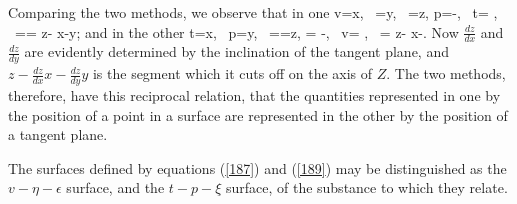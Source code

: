 \documentclass[12pt]{article}
\begin{document}
Comparing the two methods, we observe that in one
\eqs v=x, \ \eta=y, \ \epsilon=z,   \label{187}\eqe
\eqs p=-, \ t= , \ \mu=\xi= z- x-y;  \label{188}\eqe
and in the other
\eqs  t=x, \ p=y, \ \mu =\xi=z,  \label{189}\eqe
\eqs \eta = -, \ v= , \ \epsilon= z- x-.  \label{190}\eqe
Now $\frac{d z}{d x}$ and $\frac{d z}{d y}$ are evidently determined by the inclination of the tangent plane, and $z- \frac{d   z}{d   x}x-\frac{d   z}{d   y}y$ is the segment which it cuts off on the axis of $Z$. The two methods, therefore, have this reciprocal relation, that the quantities represented in one by the position of a point in a surface are represented in the other by the position of a tangent plane.


The surfaces defined by equations (\ref{187}) and (\ref{189}) may be distinguished as the $v\!-\eta\!-\epsilon$ surface, and the $t\!-p\!-\xi$ surface, of the substance to which they relate.
\end{document}
